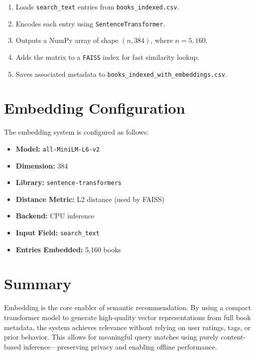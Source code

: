\begin{enumerate}
    \item Loads \texttt{search\_text} entries from \texttt{books\_indexed.csv}.
    \item Encodes each entry using \texttt{SentenceTransformer}.
    \item Outputs a NumPy array of shape $(n, 384)$, where $n=5,160$.
    \item Adds the matrix to a \texttt{FAISS} index for fast similarity lookup.
    \item Saves associated metadata to \texttt{books\_indexed\_with\_embeddings.csv}.
\end{enumerate}

\section{Embedding Configuration}
\label{sec:embedding-config}

The embedding system is configured as follows:

\begin{itemize}
    \item \textbf{Model:} \texttt{all-MiniLM-L6-v2}
    \item \textbf{Dimension:} 384
    \item \textbf{Library:} \texttt{sentence-transformers}
    \item \textbf{Distance Metric:} L2 distance (used by FAISS)
    \item \textbf{Backend:} CPU inference
    \item \textbf{Input Field:} \texttt{search\_text}
    \item \textbf{Entries Embedded:} 5,160 books
\end{itemize}

\section{Summary}
\label{sec:embedding-summary}

Embedding is the core enabler of semantic recommendation. By using a compact transformer model to generate high-quality vector representations from full book metadata, the system achieves relevance without relying on user ratings, tags, or prior behavior. This allows for meaningful query matches using purely content-based inference—preserving privacy and enabling offline performance.
